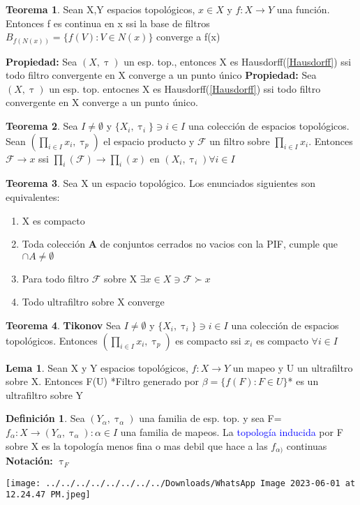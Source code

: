 \documentclass{article}
\theoremstyle{definition}
\newtheorem{definition}{Definición}[section]
\newtheorem{theorem}{Teorema}[section]
\newtheorem{lemma}{Lema}[section]
\begin{document}
\begin{theorem}
	Sean X,Y espacios topológicos, $x\in X$  y $f:X\to Y$ una función. Entonces f es continua en x ssi la base de filtros $B_{f(N(x))}=\{f(V):V\in N(x)\}$ converge a f(x)
\end{theorem}
\textbf{Propiedad: }
Sea $(X,\uptau)$ un esp. top., entonces X es Hausdorff(\ref{Hausdorff}) ssi todo filtro convergente en X converge a un punto único
\textbf{Propiedad: } 
Sea $(X,\uptau)$ un esp. top. entocnes X es Hausdorff(\ref{Hausdorff}) ssi todo filtro convergente en X converge a un punto único.
\begin{theorem}
	Sea $I\neq\emptyset$ y $\{X_i,\uptau_i\}\ni i\in I$ una colección de espacios topológicos. Sean $(\prod_{i\in I}x_i,\uptau_p)$ el espacio producto y $\mathcal{F}$ un filtro sobre $\prod_{i\in I}x_i$. Entonces $\mathcal{F}\to x$ ssi $\prod_{i}(\mathcal{F})\to \prod_i(x)$ en $(X_i,\uptau_i) \forall i\in I$
\end{theorem}
\begin{theorem}
	Sea X un espacio topológico. Los enunciados siguientes son equivalentes:
	\begin{enumerate}
		\item X es compacto
		\item Toda colección \textbf{A} de conjuntos cerrados no vacios con la PIF, cumple que $\cap A\neq\emptyset$
		\item Para todo filtro $\mathcal{F}$ sobre X $\exists x\in X\ni \mathcal{F} \succ x$
		\item Todo ultrafiltro sobre X converge
	\end{enumerate}
\end{theorem}
\begin{theorem}\textbf{Tikonov}
	Sea $I\neq\emptyset$ y $\{X_i,\uptau_i\}\ni i\in I$ una colección de espacios topológicos. Entonces $(\prod_{i\in I}x_i,\uptau_p)$ es compacto ssi $x_i$ es compacto $\forall i \in I$
\end{theorem}
\begin{lemma}
	Sean X y Y espacios topológicos, $f:X\to Y$ un mapeo y U un ultrafiltro sobre X. Entonces F(U) *Filtro generado por $\beta = \{f(F):F\in U\}$* es un ultrafiltro sobre Y
\end{lemma}
\begin{definition}
	Sea $(Y_{\alpha},\uptau_{\alpha})$ una familia de esp. top. y sea F={$f_{\alpha}: X\to (Y_{\alpha},\uptau_{\alpha}): \alpha\in I$} una familia de mapeos. La \textcolor{blue}{topología inducida} por F sobre X es la topología menos fina o mas debil que hace a las $f_{\alpha)}$ continuas\\
\textbf{Notación: } $\uptau_F$
\end{definition}
\texttt{[image: ../../../../../../../../Downloads/WhatsApp Image 2023-06-01 at 12.24.47 PM.jpeg]} \\
\end{document}
